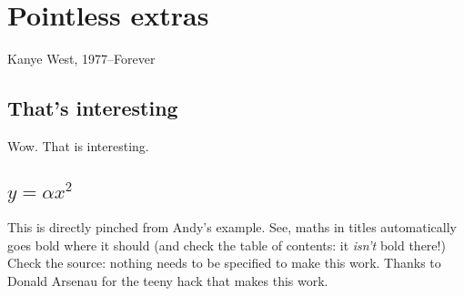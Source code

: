 \chapter{Pointless extras}
\label{app:Pointless}

{Kanye West, 1977--Forever}


\section{That's interesting}
\label{sec:Duh}
Wow. That is interesting.

\section{$y = \alpha x^2$}
\label{sec:EqnTitle}
This is directly pinched from Andy's example. See, maths in titles automatically
goes bold where it should (and check the
table of contents: it \emph{isn't} bold there!) Check the source: nothing
needs to be specified to make this work. Thanks to Donald Arsenau for the
teeny hack that makes this work.

%
